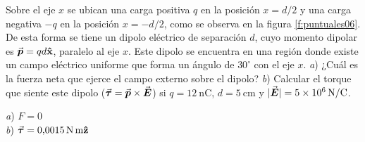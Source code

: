%
\begin{Exercise}\label{p:puntuales06}
  Sobre el eje $x$ se ubican una carga positiva $q$ en la posición $x = d/2$ y una carga negativa $-q$ en la posición $x = -d/2$, como se observa en la figura \ref{f:puntuales06}. De esta forma se tiene un dipolo eléctrico de separación $d$, cuyo momento dipolar es $\va*{p}=qd\vu{x}$, paralelo al eje $x$. Este dipolo se encuentra en una región donde existe un campo eléctrico uniforme que forma un ángulo de $30^\circ$ con el eje $x$. \textit{a}) ¿Cuál es la fuerza neta que ejerce el campo externo sobre el dipolo? \textit{b}) Calcular el torque que siente este dipolo ($\va*{\tau} = \va*{p} \times \va*{E}$) si $q = \SI{12}{\nano\coulomb}$, $d = \SI{5}{\centi\metre}$ y $|\va*{E}| = \SI{5E6}{\newton/\coulomb}$.
\end{Exercise}
\begin{Answer}
  \begin{minipage}[t]{.4\textwidth}
    \textit{a}) $F = 0$\\ \textit{b}) $\va*{\tau} = \SI{0.0015}{\newton.\metre}\vu{z}$
  \end{minipage}
\end{Answer}
%
\begin{center}
\end{center}
%